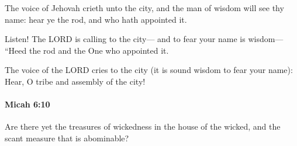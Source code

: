 			\begin{versebox}
					\item[BHS] 
					\item[LXX] 
					\item[ASV] The voice of Jehovah crieth unto the city, and the man of wisdom will see thy name: hear ye the rod, and who hath appointed it.
					\item[NIV] Listen! The LORD is calling to the city— and to fear your name is wisdom— “Heed the rod and the One who appointed it.
					\item[NRSV] The voice of the LORD cries to the city (it is sound wisdom to fear your name): Hear, O tribe and assembly of the city!
			\end{versebox}

		\paragraph{Micah 6:10} %
			\label{MICAH-6-10}

			Are there yet the treasures of wickedness in the house of the wicked, and the scant measure that is abominable?

